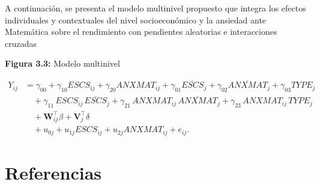 \documentclass[
  spanish,
  a4paper,
  oneside]{scrbook}
\begin{document}
A continuación, se presenta el modelo multinivel propuesto que integra
los efectos individuales y contextuales del nivel socioeconómico y la
ansiedad ante Matemática sobre el rendimiento con pendientes aleatorias
e interacciones cruzadas

\textbf{Figura 3.3:} Modelo multinivel

\[
\begin{aligned}
Y_{ij} &= \gamma_{00}
+ \gamma_{10} ESCS_{ij}
+ \gamma_{20} ANXMAT_{ij}
+ \gamma_{01} \overline{ESCS}_{j}
+ \gamma_{02} \overline{ANXMAT}_{j}
+ \gamma_{03} TYPE_{j} \\
&\quad
+ \gamma_{11}\, ESCS_{ij}\,\overline{ESCS}_{j}
+ \gamma_{21}\, ANXMAT_{ij}\,\overline{ANXMAT}_{j}
+ \gamma_{23}\, ANXMAT_{ij}\,TYPE_{j} \\
&\quad
+ \mathbf{W}_{ij}^{\top}\beta
+ \mathbf{V}_{j}^{\top}\delta \\
&\quad
+ u_{0j}
+ u_{1j} ESCS_{ij}
+ u_{2j} ANXMAT_{ij}
+ e_{ij}.
\end{aligned}
\]


\chapter{Referencias}\label{referencias}
\end{document}
